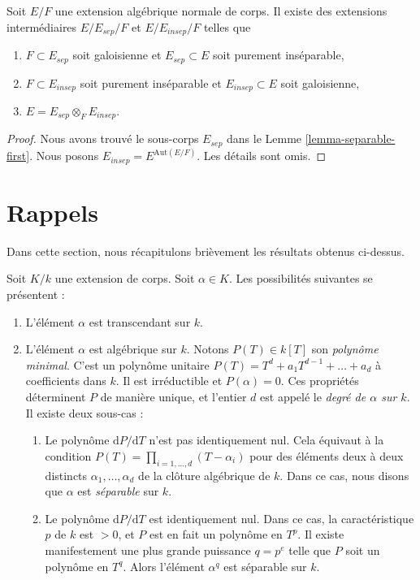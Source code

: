 \begin{lemma}
\label{lemma-normal-case}
Soit $E/F$ une extension algébrique normale de corps. Il existe des extensions intermédiaires
$E / E_{sep} /F$ et $E / E_{insep} / F$ telles que
\begin{enumerate}
\item $F \subset E_{sep}$ soit galoisienne et $E_{sep} \subset E$
soit purement inséparable,
\item $F \subset E_{insep}$ soit purement inséparable et $E_{insep} \subset E$
soit galoisienne,
\item $E = E_{sep} \otimes_F E_{insep}$.
\end{enumerate}
\end{lemma}

\begin{proof}
Nous avons trouvé le sous-corps $E_{sep}$ dans le Lemme \ref{lemma-separable-first}.
Nous posons $E_{insep} = E^{\text{Aut}(E/F)}$. Les détails sont omis.
\end{proof}









\section{Rappels}
\label{section-algebraic}

\noindent
Dans cette section, nous récapitulons brièvement les résultats obtenus ci-dessus.

\medskip\noindent
Soit $K/k$ une extension de corps. Soit $\alpha \in K$. Les
possibilités suivantes se présentent :
\begin{enumerate}
\item L'élément $\alpha$ est transcendant sur $k$.
\item L'élément $\alpha$ est algébrique sur $k$. Notons
$P(T) \in k[T]$ son {\it polynôme minimal}. C'est un polynôme unitaire
$P(T) = T^d + a_1 T^{d - 1} + \ldots + a_d$ à coefficients dans
$k$. Il est irréductible et $P(\alpha) = 0$. Ces propriétés
déterminent $P$ de manière unique, et l'entier $d$ est appelé le
{\it degré de $\alpha$ sur $k$}. Il existe deux sous-cas :
\begin{enumerate}
\item Le polynôme $\text{d}P/\text{d}T$ n'est pas identiquement nul.
Cela équivaut à la condition
$P(T) = \prod_{i = 1, \ldots, d} (T - \alpha_i)$ pour des
éléments deux à deux distincts $\alpha_1, \ldots, \alpha_d$
de la clôture algébrique de $k$.
Dans ce cas, nous disons que $\alpha$ est {\it séparable} sur $k$.
\item Le polynôme $\text{d}P/\text{d}T$ est identiquement nul. Dans ce cas, la
caractéristique $p$ de $k$ est $ > 0$, et $P$ est en fait un polynôme
en $T^p$. Il existe manifestement une plus grande puissance $q = p^e$ telle que $P$ soit
un polynôme en $T^q$. Alors l'élément $\alpha^q$ est séparable sur $k$.
\end{enumerate}
\end{enumerate}

